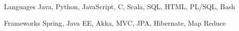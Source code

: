 
\begin{cvskills}
  \cvskill
    {Languages} %
    {Java, Python, JavaScript, C, Scala, SQL, HTML, PL/SQL, Bash} %

  \cvskill
    {Frameworks} %
    {Spring, Java EE, Akka, MVC, JPA, Hibernate, Map Reduce} %
    
\end{cvskills}

